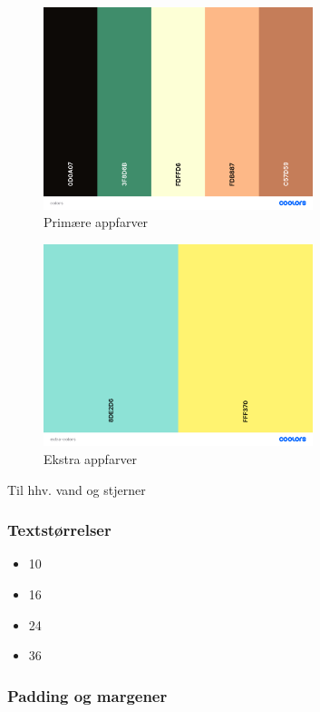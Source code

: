 \begin{figure}[H]
    \label{primære-farver}
    \centering
    \includegraphics[width=0.7\textwidth]{img/colors.png}
    \caption{Primære appfarver}
\end{figure}

\begin{figure}[H]
    \label{sekundære-farver}
    \centering
    \includegraphics[width=0.7\textwidth]{img/extra-colors.png}
    \caption{Ekstra appfarver}
\end{figure}

Til hhv. vand og stjerner

\subsubsection*{Textstørrelser}

\begin{itemize}
    \item 10
    \item 16
    \item 24
    \item 36
\end{itemize}

\subsubsection*{Padding og margener}

